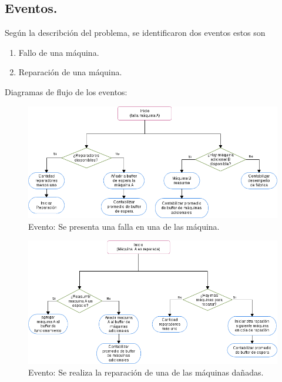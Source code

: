 \documentclass[10pt]{article}
\begin{document}
\newpage 


\subsection{Eventos.}

Según la describción del problema, se identificaron dos eventos estos son

\begin{enumerate}
\item Fallo de una máquina.



\item Reparación de una máquina.

\end{enumerate}


Diagramas de flujo de los eventos:

\begin{figure}
  \centering
  	\includegraphics[scale=0.47]{EventoFallo.png} 
  \caption{Evento: Se presenta una falla en una de las máquina.}
  \label{fig:eventofallo}
\end{figure}

\begin{figure}
  \centering
  	\includegraphics[scale=0.47]{EventoReparacion.png} 
  \caption{Evento: Se realiza la reparación de una de las máquinas dañadas.}
  \label{fig:eventoreparacion}
\end{figure}
\end{document}
